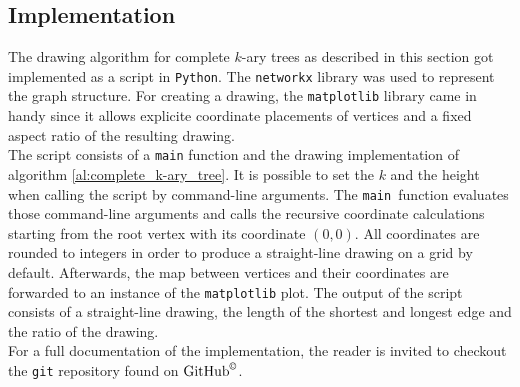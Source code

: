 \subsection{Implementation}

The drawing algorithm for complete $k$-ary trees as described in this section got implemented as a script in \texttt{Python}. The \texttt{networkx} library was used to represent the graph structure. For creating a drawing, the \texttt{matplotlib} library came in handy since it allows explicite coordinate placements of vertices and a fixed aspect ratio of the resulting drawing.\\
The script consists of a \texttt{main} function and the drawing implementation of algorithm \ref{al:complete_k-ary_tree}. It is possible to set the $k$ and the height when calling the script by command-line arguments. The \texttt{main }function evaluates those command-line arguments and calls the recursive coordinate calculations starting from the root vertex with its coordinate $(0,0)$. All coordinates are rounded to integers in order to produce a straight-line drawing on a grid by default. Afterwards, the map between vertices and their coordinates are forwarded to an instance of the \texttt{matplotlib} plot. The output of the script consists of a straight-line drawing, the length of the shortest and longest edge and the ratio of the drawing.
\bigskip\\
For a full documentation of the implementation, the reader is invited to checkout the \texttt{git} repository found on $\text{GitHub}^{\copyright}$\cite{repository}.

